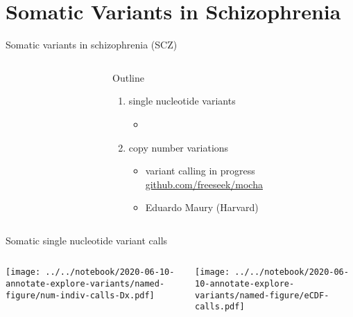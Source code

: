 \documentclass[usenames,dvipsnames]{beamer}
\begin{document}
\section{Somatic Variants in Schizophrenia}

\begin{frame}{Somatic variants in schizophrenia (SCZ)}
\begin{columns}[t]
\begin{column}{0.3\textwidth}

\end{column}

\begin{column}{0.7\textwidth}
Outline
\begin{enumerate}
	\item single nucleotide variants
		\begin{itemize}
			\item 
		\end{itemize}
        \item copy number variations
		\begin{itemize}
			\item variant calling in progress \\
				\url{github.com/freeseek/mocha}
			\item Eduardo Maury (Harvard)
		\end{itemize}
\end{enumerate}
\end{column}
\end{columns}
\end{frame}

\begin{frame}{Somatic single nucleotide variant calls}
\begin{columns}[t]
\begin{column}{0.7\textwidth}

\texttt{[image: ../../notebook/2020-06-10-annotate-explore-variants/named-figure/num-indiv-calls-Dx.pdf]}
\end{column}

\begin{column}{0.5\textwidth}

\texttt{[image: ../../notebook/2020-06-10-annotate-explore-variants/named-figure/eCDF-calls.pdf]}
\end{column}
\end{columns}
\end{frame}

\end{document}
